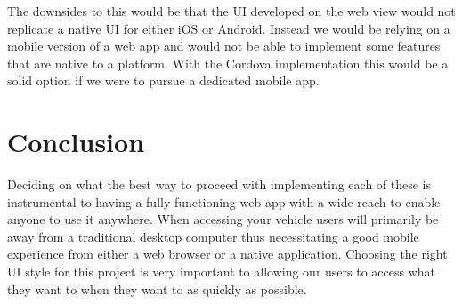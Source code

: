 \documentclass[10pt,draftclsnofoot,onecolumn,journal,compsoc]{IEEEtran}
\begin{document}
The downsides to this would be that the UI developed on the web view would not replicate a native UI for either iOS or Android. Instead we would be relying on a mobile version of a web app and would not be able to implement some features that are native to a platform. With the Cordova implementation this would be a solid option if we were to pursue a dedicated mobile app.

\section{Conclusion}
Deciding on what the best way to proceed with implementing each of these is instrumental to having a fully functioning web app with a wide reach to enable anyone to use it anywhere. When accessing your vehicle users will primarily be away from a traditional desktop computer thus necessitating a good mobile experience from either a web browser or a native application. Choosing the right UI style for this project is very important to allowing our users to access what they want to when they want to as quickly as possible. 

\newpage


\end{document}
